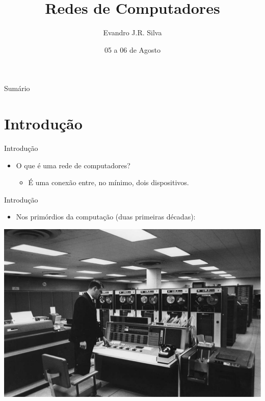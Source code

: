 \documentclass{libs/ufc_format}
\title[ML]{\huge\textbf{Redes de Computadores}}
\subtitle{}
\author{Evandro J.R. Silva}
\institute[Estácio Teresina]{
    \normalsize{\email{ejrs.profissional@gmail.com}}
    \newline
    \department{Bacharelado em Ciência da Computação}
    \newline
    \estaciothe
}
\date{05 a 06 de Agosto}
\begin{document}


\begin{frame}{}
    \maketitle
\end{frame}

\begin{frame}{Sumário}
    \begin{multicols}{2}
        \tableofcontents
    \end{multicols}
\end{frame}

\section{Introdução}

\begin{frame}{Introdução}
    \begin{itemize}
        \justifying
        \item O que é uma rede de computadores?
            \begin{itemize}
                \justifying
                \item<2-> É uma conexão entre, no mínimo, dois dispositivos.
            \end{itemize}
    \end{itemize}
\end{frame}

\begin{frame}{Introdução}
    \begin{itemize}
        \justifying
        \item Nos primórdios da computação (duas primeiras décadas):
    \end{itemize}
    \includegraphics[width=\textwidth]{media/mainframe1}
\end{frame}
\end{document}
